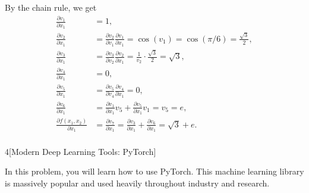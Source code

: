 \documentclass[expanded]{lkx_pset}
\begin{document}
\begin{solution}
\begin{solution}
		By the chain rule, we get
		\begin{align*}
			\frac{\partial v_1}{\partial x_1}        & = 1,                                                                                                                         \\
			\frac{\partial v_2}{\partial x_1}        & = \frac{\partial v_2}{\partial v_1}\frac{\partial v_1}{\partial x_1} = \cos(v_1) = \cos(\pi/6) = \frac{\sqrt{3}}{2},         \\
			\frac{\partial v_3}{\partial x_1}        & = \frac{\partial v_3}{\partial v_2}\frac{\partial v_2}{\partial x_1} = \frac{1}{v_2} \cdot \frac{\sqrt{3}}{2} = \sqrt{3},    \\
			\frac{\partial v_4}{\partial x_1}        & = 0,                                                                                                                         \\
			\frac{\partial v_5}{\partial x_1}        & = \frac{\partial v_5}{\partial v_4}\frac{\partial v_4}{\partial x_1} = 0,                                                    \\
			\frac{\partial v_6}{\partial x_1}        & = \frac{\partial v_1}{\partial x_1}v_5 + \frac{\partial v_5}{\partial x_1}v_1 = v_5 = e,                                     \\
			\frac{\partial f(x_1,x_2)}{\partial x_1} & = \frac{\partial v_7}{\partial x_1}  = \frac{\partial v_3}{\partial x_1} + \frac{\partial v_6}{\partial x_1} = \sqrt{3} + e. \\
		\end{align*}
	\end{solution}
\end{solution}

\begin{problem}{4}[Modern Deep Learning Tools: PyTorch]

In this problem, you will learn how to use PyTorch. This machine learning library is massively popular and used heavily throughout industry and research.
\end{problem}
\end{document}
